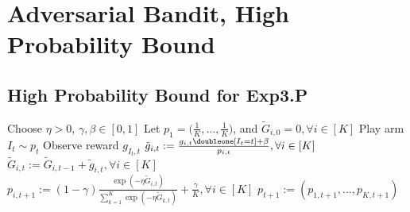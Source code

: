 \clearpage
\section{Adversarial Bandit, High Probability Bound} %


\subsection{High Probability Bound for Exp3.P} %

\begin{alg}[Exp3.P] \leavevmode
    \begin{framed}
        \begin{algorithmic}
            \State Choose $\eta>0$, $\gamma,\beta\in[0,1]$
            \State Let $p_1=\big(\frac{1}{K},\dots,\frac{1}{K}\big)$,
                and $\tilde G_{i,0}=0, \forall i\in [K]$
                \State Play arm $I_t\sim p_t$
                \State Observe reward $g_{I_t, t}$
                \State $\tilde g_{i,t}:=\frac{g_{i,t}\doubleone[I_t=t]+\beta}{p_{i,t}}, \forall i\in[K]$
                \State $\tilde G_{i,t} := \tilde G_{i,t-1} + \tilde g_{i,t}, \forall i\in[K]$
                \State $p_{i,t+1}:=(1-\gamma)\frac{\exp(-\eta\tilde G_{i,t})}{\sum_{k=1}^K \exp(-\eta\tilde G_{k,t})} + \frac{\gamma}{K}, \forall i\in[K]$
                \State $p_{t+1} := (p_{1,t+1},\dots,p_{K,t+1})$
            \EndFor
        \end{algorithmic}
    \end{framed}
\end{alg}

